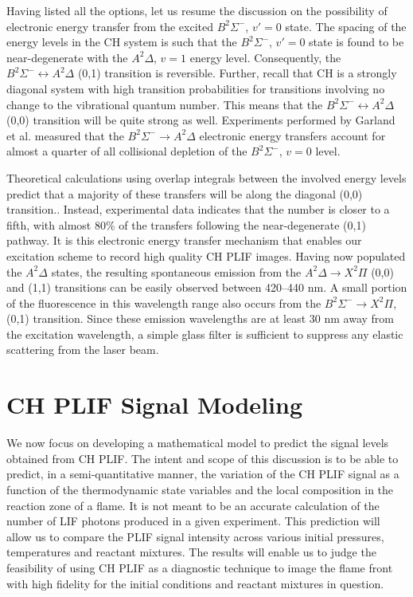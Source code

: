 Having listed all the options, let us resume the discussion on the possibility of electronic energy transfer from the excited \(B^2\Sigma^-\), \(v'=0\) state.
The spacing of the energy levels in the CH system is such that the \(B^2\Sigma^-\), \(v'=0\) state is found to be near-degenerate with the \(A^2\Delta\), \(v=1\) energy level.
Consequently, the \(B^2\Sigma^-\leftrightarrow A^2\Delta\) (0,1) transition is reversible.
Further, recall that CH is a strongly diagonal system with high transition probabilities for transitions involving no change to the vibrational quantum number.
This means that the \(B^2\Sigma^-\leftrightarrow A^2\Delta\) (0,0) transition will be quite strong as well.
Experiments performed by Garland et al.\cite{1985-garland-b} measured that the \(B^2\Sigma^-\rightarrow A^2\Delta\) electronic energy transfers account for almost a quarter of all collisional depletion of the \(B^2\Sigma^-\), \(v=0\) level.

Theoretical calculations using overlap integrals between the involved energy levels predict that a majority of these transfers will be along the diagonal (0,0) transition.\cite{2000-luque}.
Instead, experimental data indicates that the number is closer to a fifth, with almost 80\% of the transfers following the near-degenerate (0,1) pathway.
It is this electronic energy transfer mechanism that enables our excitation scheme to record high quality CH PLIF images.
Having now populated the \(A^2\Delta\) states, the resulting spontaneous emission from the \(A^2\Delta\rightarrow X^2\Pi\) (0,0) and (1,1) transitions can be easily observed between 420--440 nm.
A small portion of the fluorescence in this wavelength range also occurs from the \(B^2\Sigma^-\rightarrow X^2\Pi\), (0,1) transition.
Since these emission wavelengths are at least 30 nm away from the excitation wavelength, a simple glass filter is sufficient to suppress any elastic scattering from the laser beam.

\section{CH PLIF Signal Modeling}
\label{sec:background-chplif-signal-modeling}

We now focus on developing a mathematical model to predict the signal levels obtained from CH PLIF.
The intent and scope of this discussion is to be able to predict, in a semi-quantitative manner, the variation of the CH PLIF signal as a function of the thermodynamic state variables and the local composition in the reaction zone of a flame.
It is not meant to be an accurate calculation of the number of LIF photons produced in a given experiment.
This prediction will allow us to compare the PLIF signal intensity across various initial pressures, temperatures and reactant mixtures.
The results will enable us to judge the feasibility of using CH PLIF as a diagnostic technique to image the flame front with high fidelity for the initial conditions and reactant mixtures in question.

